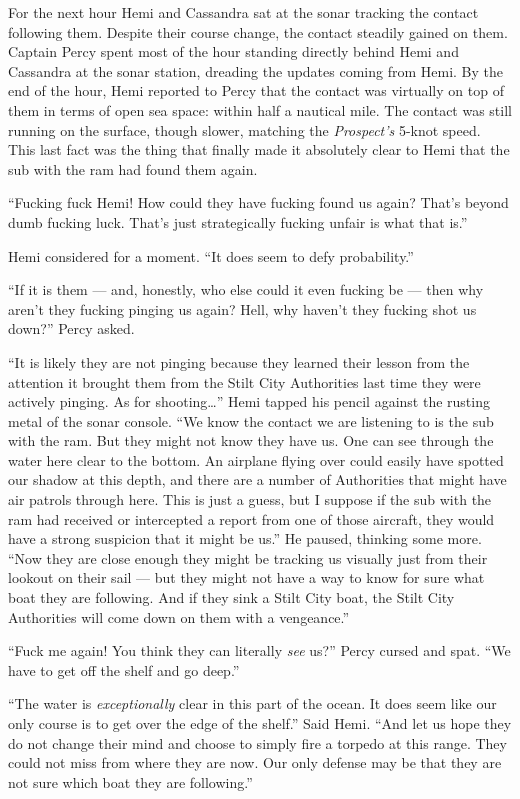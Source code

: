 \documentclass[]{scrbook}
\begin{document}
For the next hour Hemi and Cassandra sat at the sonar tracking the
contact following them. Despite their course change, the contact
steadily gained on them. Captain Percy spent most of the hour standing
directly behind Hemi and Cassandra at the sonar station, dreading the
updates coming from Hemi. By the end of the hour, Hemi reported to Percy
that the contact was virtually on top of them in terms of open sea
space: within half a nautical mile. The contact was still running on the
surface, though slower, matching the \emph{Prospect's} 5-knot speed.
This last fact was the thing that finally made it absolutely clear to
Hemi that the sub with the ram had found them again.

``Fucking fuck Hemi! How could they have fucking found us again? That's
beyond dumb fucking luck. That's just strategically fucking unfair is
what that is.''

Hemi considered for a moment. ``It does seem to defy probability.''

``If it is them --- and, honestly, who else could it even fucking be ---
then why aren't they fucking pinging us again? Hell, why haven't they
fucking shot us down?'' Percy asked.

``It is likely they are not pinging because they learned their lesson
from the attention it brought them from the Stilt City Authorities last
time they were actively pinging. As for shooting\ldots{}'' Hemi tapped
his pencil against the rusting metal of the sonar console. ``We know the
contact we are listening to is the sub with the ram. But they might not
know they have us. One can see through the water here clear to the
bottom. An airplane flying over could easily have spotted our shadow at
this depth, and there are a number of Authorities that might have air
patrols through here. This is just a guess, but I suppose if the sub
with the ram had received or intercepted a report from one of those
aircraft, they would have a strong suspicion that it might be us.'' He
paused, thinking some more. ``Now they are close enough they might be
tracking us visually just from their lookout on their sail --- but they
might not have a way to know for sure what boat they are following. And
if they sink a Stilt City boat, the Stilt City Authorities will come
down on them with a vengeance.''

``Fuck me again! You think they can literally \emph{see} us?'' Percy
cursed and spat. ``We have to get off the shelf and go deep.''

``The water is \emph{exceptionally} clear in this part of the ocean. It
does seem like our only course is to get over the edge of the shelf.''
Said Hemi. ``And let us hope they do not change their mind and choose to
simply fire a torpedo at this range. They could not miss from where they
are now. Our only defense may be that they are not sure which boat they
are following.''
\end{document}
